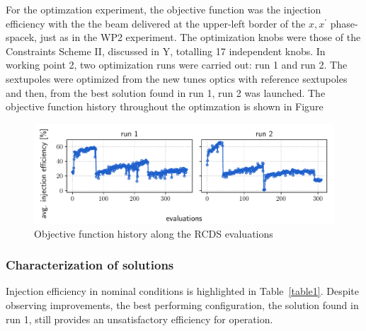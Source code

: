 For the optimzation experiment, the objective function was the injection efficiency with the the beam delivered at the upper-left border of the $x,x^\prime$ phase-spacek, just as in the WP2 experiment. The optimization knobs were those of the Constraints Scheme II, discussed in Y, totalling 17 independent knobs. In working point 2, two optimization runs were carried out: run 1 and run 2. The sextupoles were optimized from the new tunes optics with reference sextupoles and then, from the best solution found in run 1, run 2 was launched. The objective function history throughout the optimzation is shown in Figure
\begin{figure}
    \includegraphics[width=\columnwidth]{Images/wp2_objfunc_hist.pdf}
    \caption{Objective function history along the RCDS evaluations}
\end{figure}
\subsubsection{Characterization of solutions}
Injection efficiency in nominal conditions is highlighted in Table~\ref{table1}. Despite observing improvements, the best performing configuration, the solution found in run 1, still provides an unsatisfactory efficiency for operation.

